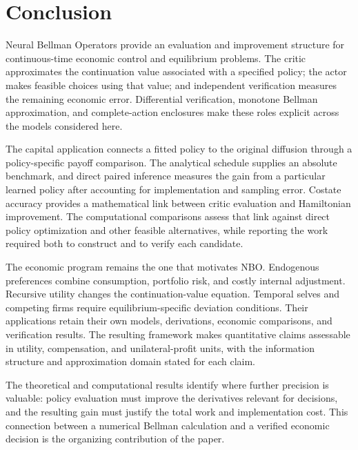 \section{Conclusion}\label{sec:conclusion}
Neural Bellman Operators provide an evaluation and improvement structure for continuous-time economic control and equilibrium problems. The critic approximates the continuation value associated with a specified policy; the actor makes feasible choices using that value; and independent verification measures the remaining economic error. Differential verification, monotone Bellman approximation, and complete-action enclosures make these roles explicit across the models considered here.

The capital application connects a fitted policy to the original diffusion through a policy-specific payoff comparison. The analytical schedule supplies an absolute benchmark, and direct paired inference measures the gain from a particular learned policy after accounting for implementation and sampling error. Costate accuracy provides a mathematical link between critic evaluation and Hamiltonian improvement. The computational comparisons assess that link against direct policy optimization and other feasible alternatives, while reporting the work required both to construct and to verify each candidate.

The economic program remains the one that motivates NBO. Endogenous preferences combine consumption, portfolio risk, and costly internal adjustment. Recursive utility changes the continuation-value equation. Temporal selves and competing firms require equilibrium-specific deviation conditions. Their applications retain their own models, derivations, economic comparisons, and verification results. The resulting framework makes quantitative claims assessable in utility, compensation, and unilateral-profit units, with the information structure and approximation domain stated for each claim.

The theoretical and computational results identify where further precision is valuable: policy evaluation must improve the derivatives relevant for decisions, and the resulting gain must justify the total work and implementation cost. This connection between a numerical Bellman calculation and a verified economic decision is the organizing contribution of the paper.
